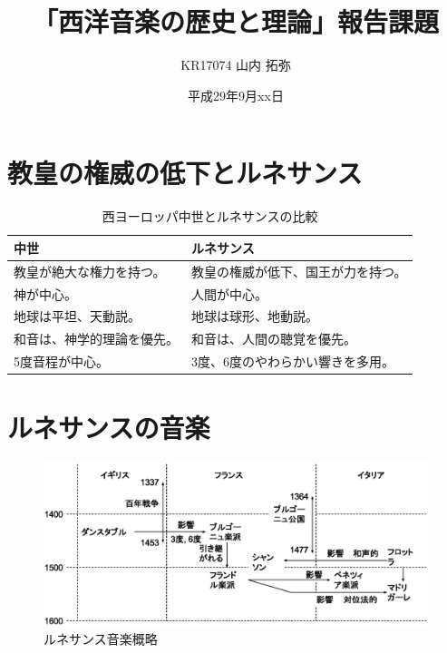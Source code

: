 \documentclass[a4j]{jarticle}
\title{「西洋音楽の歴史と理論」報告課題}
\author{KR17074 山内 拓弥}
\date{平成29年9月xx日}
\begin{document}

\section{教皇の権威の低下とルネサンス}

\begin{table}[tb]
 \begin{center}
  \caption{西ヨーロッパ中世とルネサンスの比較}
  \label{tab:comparison}
  \begin{tabular}{|l|l|} \hline
  中世                       & ルネサンス                         \\
  \hline \hline
  教皇が絶大な権力を持つ。   & 教皇の権威が低下、国王が力を持つ。 \\ \hline
  神が中心。                 & 人間が中心。                       \\ \hline
  地球は平坦、天動説。       & 地球は球形、地動説。               \\ \hline
  和音は、神学的理論を優先。 & 和音は、人間の聴覚を優先。         \\
  5度音程が中心。            & 3度、6度のやわらかい響きを多用。   \\ \hline
  \end{tabular}
 \end{center}
\end{table}

\section{ルネサンスの音楽}

\begin{figure}[tb]
 \begin{center}
  \includegraphics[width=\hsize]{fig/renaissance_summary.eps}
  \caption{ルネサンス音楽概略}
  \label{fig:renaissance_summary}
 \end{center}
\end{figure}
\end{document}
